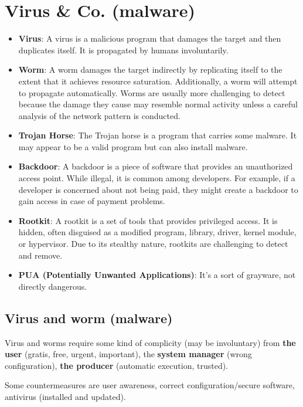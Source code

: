 \section{Virus \& Co. (malware)}
\begin{itemize}
	\item \textbf{Virus}:
	      A virus is a malicious program that damages the target and then duplicates itself. It is propagated by humans involuntarily.
	\item \textbf{Worm}:
	      A worm damages the target indirectly by replicating itself to the extent that it achieves resource saturation. Additionally, a worm will attempt to propagate automatically. Worms are usually more challenging to detect because the damage they cause may resemble normal activity unless a careful analysis of the network pattern is conducted.
	\item \textbf{Trojan Horse}:
	      The Trojan horse is a program that carries some malware. It may appear to be a valid program but can also install malware.
	\item \textbf{Backdoor}:
	      A backdoor is a piece of software that provides an unauthorized access point. While illegal, it is common among developers. For example, if a developer is concerned about not being paid, they might create a backdoor to gain access in case of payment problems.
	\item \textbf{Rootkit}:
	      A rootkit is a set of tools that provides privileged access. It is hidden, often disguised as a modified program, library, driver, kernel module, or hypervisor. Due to its stealthy nature, rootkits are challenging to detect and remove.
	\item \textbf{PUA (Potentially Unwanted Applications)}:
	      It's a sort of grayware, not directly dangerous.
\end{itemize}


\subsection{Virus and worm (malware)}
Virus and worms require some kind of complicity (may be involuntary) from \textbf{the user} (gratis, free, urgent,
important), the \textbf{system manager} (wrong configuration), \textbf{the producer} (automatic execution, trusted).

Some countermeasures are user awareness, correct configuration/secure software, antivirus (installed and updated).


